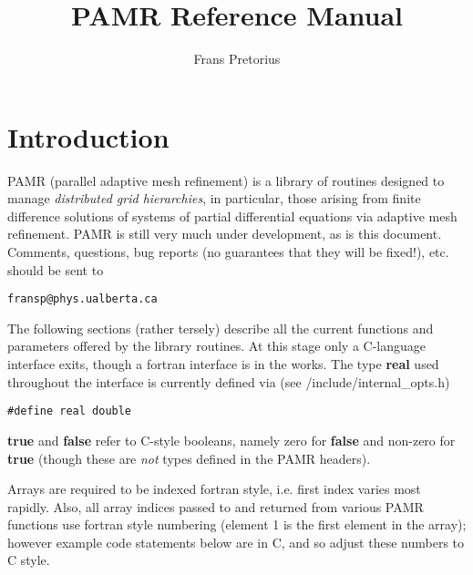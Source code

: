 \documentclass[aps,amssymb,unsortedaddress,nofootinbib]{revtex4}
\begin{document}
\title{PAMR Reference Manual}

\author{Frans Pretorius}

\address{Department of Physics \\
P-412, Avadh Bhatia Physics Laboratory \\
University of Alberta \\
Edmonton, AB, T6G 2J1}

\maketitle

\tableofcontents

\section{Introduction}

PAMR (parallel adaptive mesh refinement) is a library of routines
designed to manage {\em distributed grid hierarchies}, in particular,
those arising from finite difference solutions of systems of partial
differential equations via adaptive mesh refinement. PAMR is still
very much under development, as is this document. Comments, questions,
bug reports (no guarantees that they will be fixed!), etc. should be
sent to
\begin{verbatim}
fransp@phys.ualberta.ca
\end{verbatim}
The following sections (rather tersely) describe all the current functions
and parameters offered by the library routines. At this stage only
a C-language interface exits, though a fortran interface is in the works.
The type {\bf real} used throughout the interface is currently defined 
via (see {\rm /include/internal\_opts.h})
\begin{verbatim}
#define real double
\end{verbatim}
{\bf true} and {\bf false} refer to C-style booleans, namely zero for
{\bf false} and non-zero for {\bf true} (though these are {\em not} 
types defined in the PAMR headers).
\par
Arrays are required to be indexed fortran style, i.e. first index
varies most rapidly. Also, all array indices passed to and returned from
various PAMR functions use fortran style numbering (element 1 is the first 
element in the array); however example code statements below are in C, 
and so adjust these numbers to C style.

\end{document}
